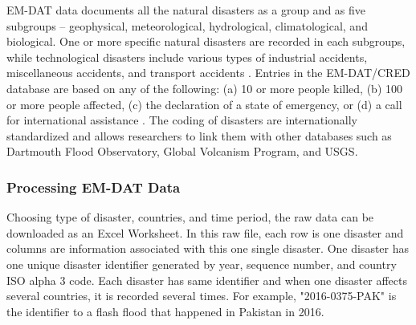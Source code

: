 EM-DAT data documents all the natural disasters as a group and as five subgroups – geophysical, meteorological, hydrological, climatological, and biological. One or more specific natural disasters are recorded in each subgroups, while technological disasters include various types of industrial accidents, miscellaneous accidents, and transport accidents \autocite{mavhura2023disaster, guha-sapir_em-dat}. 
Entries in the EM-DAT/CRED database are based on any of the following: (a) 10 or more people killed, (b) 100 or more people affected, (c) the declaration of a state of emergency, or (d) a call for international assistance \autocite{panwar2020disaster, mavhura2023disaster, sy2019flood}. The coding of disasters are internationally standardized and allows researchers to link them with other databases such as Dartmouth Flood Observatory, Global Volcanism Program, and USGS. 

\blindtext 

\subsubsection{Processing EM-DAT Data}

Choosing type of disaster, countries, and time period, the raw data can be downloaded as an Excel Worksheet. 
In this raw file, each row is one disaster and columns are information associated with this one single disaster. One disaster has one unique disaster identifier generated by year, sequence number, and country ISO alpha 3 code. Each disaster has same identifier and when one disaster affects several countries, it is recorded several times. For example, "2016-0375-PAK" is the identifier to a flash flood that happened in Pakistan in 2016. 

\blindtext

\clearpage 


  